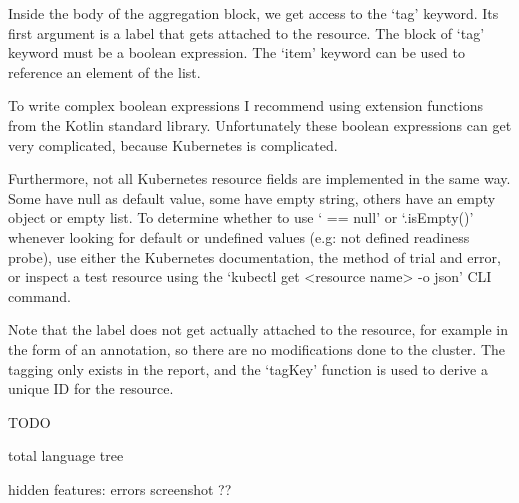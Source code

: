 Inside the body of the aggregation block, we get access to the `tag' keyword. Its first argument is a label that gets attached to the resource. The block of `tag' keyword must be a boolean expression. The `item' keyword can be used to reference an element of the list.

To write complex boolean expressions I recommend using extension functions from the Kotlin standard library. Unfortunately these boolean expressions can get very complicated, because Kubernetes is complicated. 

Furthermore, not all Kubernetes resource fields are implemented in the same way. Some have null as default value, some have empty string, others have an empty object or empty list. To determine whether to use ` == null' or `.isEmpty()' whenever looking for default or undefined values (e.g: not defined readiness probe), use either the Kubernetes documentation, the method of trial and error, or inspect a test resource using the `kubectl get <resource name> -o json' CLI command.

Note that the label does not get actually attached to the resource, for example in the form of an annotation, so there are no modifications done to the cluster. The tagging only exists in the report, and the `tagKey' function is used to derive a unique ID for the resource.


TODO

total language tree

hidden features:
    errors 
    screenshot ??
